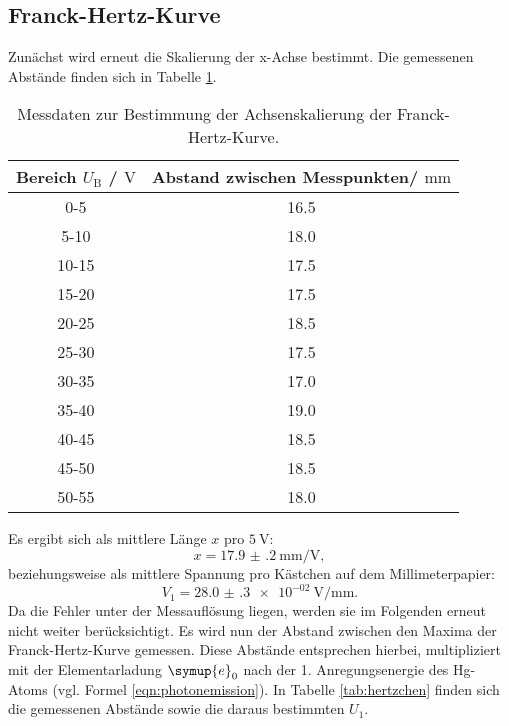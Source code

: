 \FloatBarrier
\subsection{Franck-Hertz-Kurve}
Zunächst wird erneut die Skalierung der x-Achse bestimmt.
Die gemessenen Abstände finden sich in Tabelle \ref{tab:franckie}.
\begin{table}
 \centering
 \caption{Messdaten zur Bestimmung der Achsenskalierung der Franck-Hertz-Kurve.}
 \label{tab:franckie}
 \begin{tabular}{cc}
	 \toprule
	 Bereich $U_{\mathrm{B}}$ / $\si{\volt}$ & Abstand zwischen Messpunkten/ $\si{\milli\meter}$ \\
	 \midrule
	 0-5 & 16.5 \\
	 5-10 & 18.0 \\
	 10-15 & 17.5 \\
	 15-20 & 17.5 \\
	 20-25 & 18.5 \\
	 25-30 & 17.5 \\
	 30-35 & 17.0 \\
	 35-40 & 19.0 \\
	 40-45 & 18.5 \\
	 45-50 & 18.5 \\
	 50-55 & 18.0 \\
	 \bottomrule
 \end{tabular}
\end{table}
Es ergibt sich als mittlere Länge $x$ pro $\SI{5}{\volt}$:
\begin{equation}
	x=\SI{17.9(2)}{\milli\meter\per\volt} \mathrm{,}
\end{equation}
beziehungsweise als mittlere Spannung pro Kästchen auf dem Millimeterpapier:
\begin{equation}
	V_1= \SI{28.0(3)e-02}{\volt\per\milli\meter} \mathrm{.}
\end{equation}
Da die Fehler unter der Messauflösung liegen, werden sie im Folgenden erneut nicht weiter berücksichtigt.
Es wird nun der Abstand zwischen den Maxima der Franck-Hertz-Kurve gemessen. Diese Abstände entsprechen hierbei, multipliziert mit der Elementarladung $\symup{e}_0$ nach \cite{e} der 1. Anregungsenergie des Hg-Atoms (vgl. Formel \eqref{eqn:photonemission}).
In Tabelle \ref{tab:hertzchen} finden sich die gemessenen Abstände sowie die daraus bestimmten $U_\mathrm{1}$.
